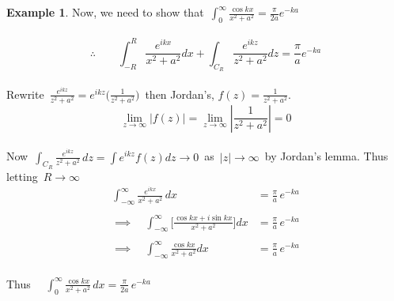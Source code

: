 \documentclass[11pt,a4paper]{article}
\theoremstyle{definition}
\newtheorem{example}[thm]{Example}
\begin{document}
\begin{example}
Now, we need to show that $\,\displaystyle{\int^{\infty}_0 \frac{\cos kx }{x^2 + a^2} = \frac{\pi}{2a}e^{-ka}}$\\\\


$$\therefore\qquad \int^R_{-R} \frac{e^{ikx}}{x^2 + a^2}dx + \int_{C_R}\frac{e^{ikz}}{z^2 + a^2}dz = \frac{\pi}{a}e^{-ka}$$\\


Rewrite $\,\frac{e^{ikz}}{z^2 + a^2} = e^{ikz}\Bigg(\frac{1}{z^2 + a^2}\Bigg)\,$ then Jordan's, $f(z) = \frac{1}{z^2 + a^2}$.\\

$$\lim\limits_{z \longrightarrow \infty} \left|f(z)\right| = \lim\limits_{z \longrightarrow \infty} \left|\frac{1}{z^2 + a^2}\right| = 0$$\\

Now $\, \int_{C_R} \frac{e^{ikz}}{z^2 + a^2}\,dz = \int e^{ikz}f(z)dz\longrightarrow 0\,$ as $\,\left|z\right| \longrightarrow \infty\,$ by Jordan's lemma. Thus letting $\, R\longrightarrow \infty$
\begin{align*}
\int^{\infty}_{-\infty} \frac{e^{ikx}}{x^2 + a^2}\,dx & = \frac{\pi}{a}\,e^{-ka}\\\\
\implies \quad \int^{\infty}_{-\infty} \Bigg[ \frac{\cos kx + i\sin kx}{x^2 + a^2}\Bigg]dx & =  \frac{\pi}{a}\,e^{-ka}\\\\
\implies \quad  \int^{\infty}_{-\infty} \frac{\cos kx}{x^2 + a^2}dx & = \frac{\pi}{a}\,e^{-ka}\\
\end{align*}

Thus $\quad \displaystyle{\int^{\infty}_0 \frac{\cos kx }{x^2 + a^2}\,dx = \frac{\pi}{2a}\,e^{-ka}}$
\end{example}
\end{document}
